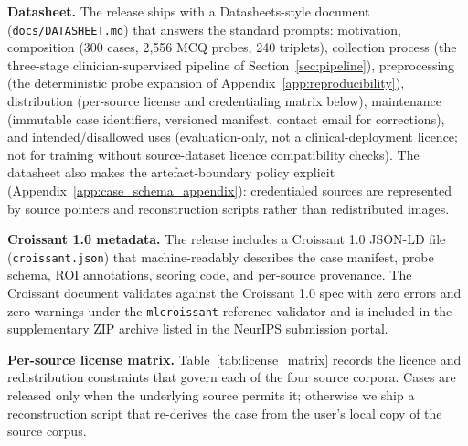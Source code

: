 \documentclass{article}
\begin{document}
\textbf{Datasheet.} The release ships with a Datasheets-style document \cite{gebru2021datasheets,pushkarna2022datacards} (\texttt{docs/DATASHEET.md}) that answers the standard prompts: motivation, composition (300 cases, 2{,}556 MCQ probes, 240 triplets), collection process (the three-stage clinician-supervised pipeline of Section~\ref{sec:pipeline}), preprocessing (the deterministic probe expansion of Appendix~\ref{app:reproducibility}), distribution (per-source license and credentialing matrix below), maintenance (immutable case identifiers, versioned manifest, contact email for corrections), and intended/disallowed uses (evaluation-only, not a clinical-deployment licence; not for training without source-dataset licence compatibility checks). The datasheet also makes the artefact-boundary policy explicit (Appendix~\ref{app:case_schema_appendix}): credentialed sources are represented by source pointers and reconstruction scripts rather than redistributed images.

\textbf{Croissant 1.0 metadata.} The release includes a Croissant 1.0 \cite{mlcommons2024croissant} JSON-LD file (\texttt{croissant.json}) that machine-readably describes the case manifest, probe schema, ROI annotations, scoring code, and per-source provenance. The Croissant document validates against the Croissant 1.0 spec with zero errors and zero warnings under the \texttt{mlcroissant} reference validator and is included in the supplementary ZIP archive listed in the NeurIPS submission portal.

\textbf{Per-source license matrix.} Table~\ref{tab:license_matrix} records the licence and redistribution constraints that govern each of the four source corpora. Cases are released only when the underlying source permits it; otherwise we ship a reconstruction script that re-derives the case from the user's local copy of the source corpus.
\end{document}
